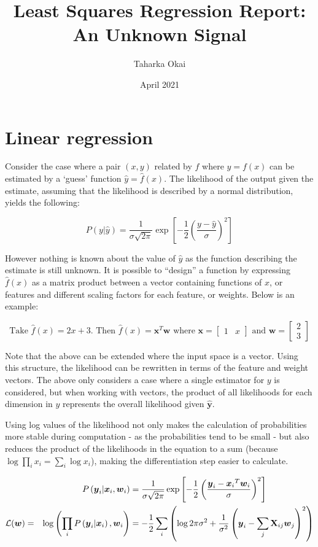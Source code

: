 \documentclass{article}
\title{Least Squares Regression Report: \\ An Unknown Signal}
\author{Taharka Okai}
\date{April 2021}
\newcommand*{\vc}[1]{\ensuremath{\boldsymbol{{#1}}}}
\newcommand*{\mt}[1]{\ensuremath{\boldsymbol{\mathbf{#1}}}
}
\newcommand*{\ndistfn}[3]{\ensuremath{\frac{1}{#3\sqrt{2\pi}}\exp{ \left[- \frac{1}{2} \left(\frac{#1 - #2}{#3}\right)^2 \right]}}}
\newcommand*{\qt}[1]{`#1'}
\newcommand{\vvc}[1]{\begin{bmatrix}#1\end{bmatrix}}
\begin{document}
\maketitle

\section{Linear regression}

\label{sec:Linear regression}

Consider the case where a pair $(x, y)$ related by $f$ where $y = f(x)$ can be estimated by a \qt{guess} function $\hat y = \hat f(x)$. The likelihood of the output given the estimate, assuming that the likelihood is described by a normal distribution, yields the following:

\[
  P\left(y |\hat y \right) = \ndistfn{ y}{\hat y}{\sigma}
\]

However nothing is known about the value of $\hat y$ as the function describing the estimate is still unknown. It is possible to ``design'' a function by expressing $\hat f(x)$ as a matrix product between a vector containing functions of $x$, or features and different scaling factors for each feature, or weights. Below is an example:

\[
  \text{Take }\hat f(x) = 2x + 3.\text{ Then }\hat f(x) = {\vc x}^T \vc w\text{ where } \vc x = \vvc{ 1 & x }\text{ and } \vc w = \vvc{ 2 \\ 3}
\]

Note that the above can be extended where the input space is a vector. Using this structure, the likelihood can be rewritten in terms of the feature and weight vectors. The above only considers a case where a single estimator for $y$ is considered, but when working with vectors, the product of all likelihoods for each dimension in $y$ represents the overall likelihood given $\hat {\vc y}$.

Using log values of the likelihood not only makes the calculation of probabilities more stable during computation - as the probabilities tend to be small - but also reduces the product of the likelihoods in the equation to a sum (because $\log \prod_i x_i = \sum_i \log x_i $), making the differentiation step easier to calculate.

\[
  \def\yhat{{\vc x_i}^T {\vc w_i}}
  \begin{aligned}
                       &
                       & P\left( \vc y_i | {\vc x_i}, \vc w_i \right)
                       & = \ndistfn{\vc y_i}{\yhat}{\sigma}
    \\
    \mathcal{L}(\vc w) & =
                       & \log \left( \prod_i  P\left( \vc y_i | {\vc x_i}\right), \vc w_i \right)
                       & = -\frac{1}{2} \sum_i \left( \log{2\pi\sigma^2} + \frac{1}{\sigma^2}\left(\vc y_i-\sum_j{\mt X_{ij}\vc w_j}\right)^2 \right)
  \end{aligned}
\]
\end{document}
